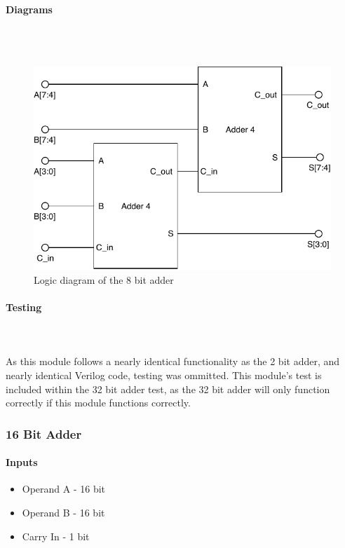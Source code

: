 \documentclass{article}
\begin{document}
    \paragraph{Diagrams}
    \hfill\\\\
    \begin{figure}[H]
        \centering
        \includegraphics{../diagrams/alu/adder/adder_8.pdf}
        \caption{Logic diagram of the 8 bit adder}
    \end{figure}

    \paragraph{Testing}
    \hfill\\\\
    As this module follows a nearly identical functionality as the 2
    bit adder, and nearly identical Verilog code, testing was ommitted.
    This module's test is included within the 32 bit adder test, as the
    32 bit adder will only function correctly if this module functions
    correctly.





    \subsubsection{16 Bit Adder}

    \paragraph{Inputs}
    \begin{itemize}
        \item Operand A - 16 bit
        \item Operand B - 16 bit
        \item Carry In - 1 bit
    \end{itemize}
\end{document}

